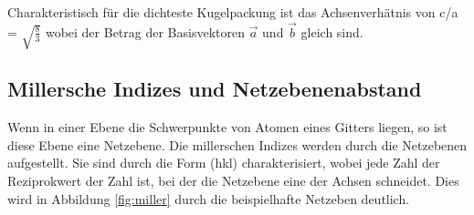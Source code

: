 Charakteristisch für die dichteste Kugelpackung ist das Achsenverhätnis von c/a = $\sqrt{\frac{8}{3}}$ wobei der Betrag der Basisvektoren $\vec{a}$ und $\vec{b}$ gleich sind.

\subsection{Millersche Indizes und Netzebenenabstand}
Wenn in einer Ebene die Schwerpunkte von Atomen eines Gitters liegen, so ist diese Ebene eine Netzebene.
Die millerschen Indizes werden durch die Netzebenen aufgestellt. 
Sie sind durch die Form (hkl) charakterisiert, wobei jede Zahl der Reziprokwert der Zahl ist, bei der die Netzebene eine der Achsen schneidet. 
Dies wird in Abbildung \ref{fig:miller} durch die beispielhafte Netzeben deutlich.

